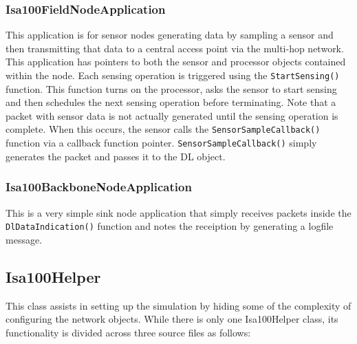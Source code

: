 \documentclass[12pt,letterpaper]{article}
\begin{document}
\subsubsection{Isa100FieldNodeApplication}

This application is for sensor nodes generating data by sampling a sensor and then transmitting that data to a central access point via the multi-hop network.  This application has pointers to both the sensor and processor objects contained within the node.  Each sensing operation is triggered using the {\tt StartSensing()} function.  This function turns on the processor, asks the sensor to start sensing and then schedules the next sensing operation before terminating.  Note that a packet with sensor data is not actually generated until the sensing operation is complete.  When this occurs, the sensor calls the {\tt SensorSampleCallback()} function via a callback function pointer.  {\tt SensorSampleCallback()} simply generates the packet and passes it to the DL object.


\subsubsection{Isa100BackboneNodeApplication}

This is a very simple sink node application that simply receives packets inside the {\tt DlDataIndication()} function and notes the receiption by generating a logfile message.


\subsection{Isa100Helper}


This class assists in setting up the simulation by hiding some of the complexity of configuring the network objects.  While there is only one Isa100Helper class, its functionality is divided across three source files as follows:
\end{document}
